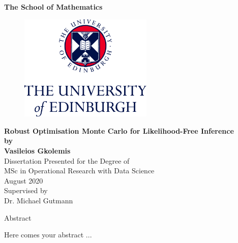 \documentclass[11pt,twoside]{article}
\numberwithin{Theorem}{section}
\numberwithin{Definition}{section}
\numberwithin{Lemma}{section}
\numberwithin{Algorithm}{section}
\numberwithin{equation}{section}
\begin{document}
\pagestyle{empty}

\begin{titlepage}
\vspace*{.5em}
\center
\textbf{\large{The School of Mathematics}} \\
\vspace*{1em}
\begin{figure}[!h]
\centering
\includegraphics[width=180pt]{images/CentredLogoCMYK.jpg}
\end{figure}
\vspace{2em}
\textbf{\Huge{Robust Optimisation Monte Carlo for Likelihood-Free Inference}}\\[2em]
\textbf{\LARGE{by}}\\
\vspace{2em}
\textbf{\LARGE{Vasileios Gkolemis}}\\
\vspace{6.5em}
\Large{Dissertation Presented for the Degree of\\
MSc in Operational Research with Data Science}\\
\vspace{6.5em}
\Large{August 2020}\\
\vspace{3em}
\Large{Supervised by\\Dr. Michael Gutmann}
\vfill
\end{titlepage}

\cleardoublepage

\begin{center}
\Large{Abstract}
\end{center}

Here comes your abstract ...
\end{document}
